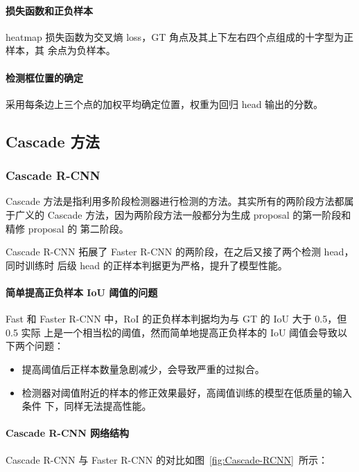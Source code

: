 \paragraph{损失函数和正负样本}
heatmap 损失函数为交叉熵 loss，GT 角点及其上下左右四个点组成的十字型为正样本，其
余点为负样本。

\paragraph{检测框位置的确定}
采用每条边上三个点的加权平均确定位置，权重为回归 head 输出的分数。

\subsection{Cascade 方法}
\label{sub:cascade}

\subsubsection{Cascade R-CNN}
\label{subsub:cascade-rcnn}

Cascade 方法是指利用多阶段检测器进行检测的方法。其实所有的两阶段方法都属于广义的
Cascade 方法，因为两阶段方法一般都分为生成 proposal 的第一阶段和精修 proposal 的
第二阶段。

Cascade R-CNN 拓展了 Faster R-CNN 的两阶段，在之后又接了两个检测 head，同时训练时
后级 head 的正样本判据更为严格，提升了模型性能。

\paragraph{简单提高正负样本 IoU 阈值的问题}
Fast 和 Faster R-CNN 中，RoI 的正负样本判据均为与 GT 的 IoU 大于 0.5，但 0.5 实际
上是一个相当松的阈值，然而简单地提高正负样本的 IoU 阈值会导致以下两个问题：

\begin{itemize}
  \item 提高阈值后正样本数量急剧减少，会导致严重的过拟合。
  \item 检测器对阈值附近的样本的修正效果最好，高阈值训练的模型在低质量的输入条件
    下，同样无法提高性能。
\end{itemize}

\paragraph{Cascade R-CNN 网络结构}
Cascade R-CNN 与 Faster R-CNN 的对比如图~\ref{fig:Cascade-RCNN}~所示：

